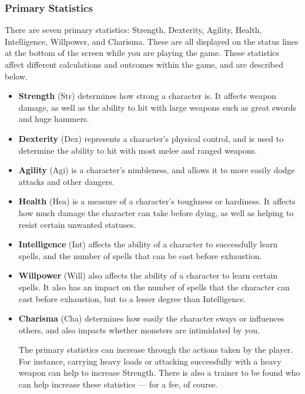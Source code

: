 \subsubsection{Primary Statistics}

There are seven primary statistics: Strength, Dexterity, Agility, Health,
Intelligence, Willpower, and Charisma.  These are all displayed on the
status lines at the bottom of the screen while you are playing the game.  
These statistics affect different calculations and outcomes within the 
game, and are described below.

\begin{itemize}
\item {\bf Strength} (Str) determines how strong a character is.  It 
affects weapon damage, as well as the ability to hit with large weapons 
such as great swords and huge hammers.

\item {\bf Dexterity} (Dex) represents a character's physical control, and 
is used to determine the ability to hit with most melee and ranged weapons.

\item {\bf Agility} (Agi) is a character's nimbleness, and allows it to 
more easily dodge attacks and other dangers.

\item {\bf Health} (Hea) is a measure of a character's toughness or 
hardiness.  It affects how much damage the character can take before dying,
as well as helping to resist certain unwanted statuses.

\item {\bf Intelligence} (Int) affects the ability of a character to 
successfully learn spells, and the number of spells that can be cast 
before exhaustion.

\item {\bf Willpower} (Will) also affects the ability of a character to 
learn certain spells.  It also has an impact on the number of spells that 
the character can cast before exhaustion, but to a lesser degree than
Intelligence.

\item {\bf Charisma} (Cha) determines how easily the character sways or
influences others, and also impacts whether monsters are intimidated by 
you.

The primary statistics can increase through the actions taken by the
player.  For instance, carrying heavy loads or attacking successfully with
a heavy weapon can help to increase Strength.  There is also a trainer
to be found who can help increase these statistics --- for a fee, of
course.

\end{itemize}
